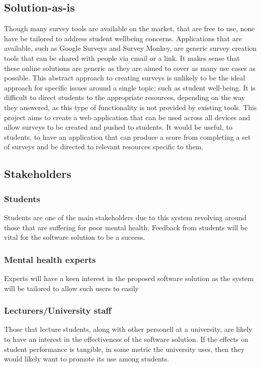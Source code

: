 \subsection{Solution-as-is}
Though many survey tools are available on the market, that are free to use, none have be tailored to address student wellbeing concerns.
Applications that are available, such as Google Surveys and Survey Monkey, are generic survey creation tools that can be shared with 
people via email or a link.
It makes sense that these online solutions are generic as they are aimed to cover as many use cases as possible.
This abstract approach to creating surveys is unlikely to be the ideal approach for specific issues around a single topic; such as
student well-being.
It is difficult to direct students to the appropriate resources, depending on the way they answered, as this type of functionality is not
provided by existing tools.
This project aims to create a web application that can be used across all devices and allow surveys to be created and pushed to students.
It would be useful, to students, to have an application that can produce a score from completing a set of surveys and be directed to relevant
resources specific to them.

\subsection{Stakeholders}

\subsubsection*{Students}
Students are one of the main stakeholders due to this system revolving around those that are suffering for poor mental health.
Feedback from students will be vital for the software solution to be a success.

\subsubsection*{Mental health experts}
Experts will have a keen interest in the proposed software solution as the system will be tailored to allow such users to easily

\subsubsection*{Lecturers/University staff}
Those that lecture students, along with other personell at a university, are likely to have an interest in the effectiveness of the software solution.
If the effects on student performance is tangible, in some metric the university uses, then they would likely want to promote its use among students.

